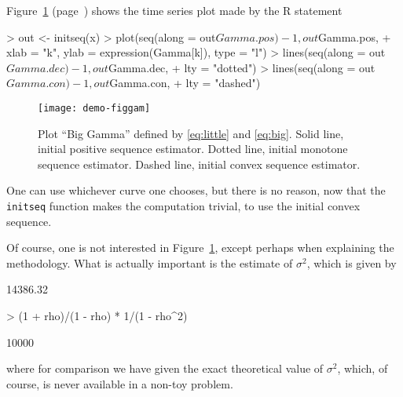 \documentclass{article}
\begin{document}
Figure~\ref{fig:gamma} (page~\pageref{fig:gamma})
shows the time series plot made by the R statement
\begin{Schunk}
\begin{Sinput}
> out <- initseq(x)
> plot(seq(along = out$Gamma.pos) - 1, out$Gamma.pos, 
+     xlab = "k", ylab = expression(Gamma[k]), type = "l")
> lines(seq(along = out$Gamma.dec) - 1, out$Gamma.dec, 
+     lty = "dotted")
> lines(seq(along = out$Gamma.con) - 1, out$Gamma.con, 
+     lty = "dashed")
\end{Sinput}
\end{Schunk}
\begin{figure}
\begin{center}
\texttt{[image: demo-figgam]}
\end{center}
\caption{Plot ``Big Gamma'' defined by \eqref{eq:little} and \eqref{eq:big}.
Solid line, initial positive sequence estimator.
Dotted line, initial monotone sequence estimator.
Dashed line, initial convex sequence estimator.}
\label{fig:gamma}
\end{figure}
One can use whichever curve one chooses, but there is no reason, now that
the \texttt{initseq} function makes the computation trivial, to use the
initial convex sequence.

Of course, one is not interested in Figure~\ref{fig:gamma}, except
perhaps when explaining the methodology.  What is actually important
is the estimate of $\sigma^2$, which is given by
\begin{Schunk}
\begin{Soutput}
[1] 14386.32
\end{Soutput}
\begin{Sinput}
> (1 + rho)/(1 - rho) * 1/(1 - rho^2)
\end{Sinput}
\begin{Soutput}
[1] 10000
\end{Soutput}
\end{Schunk}
where for comparison we have given the exact theoretical value of $\sigma^2$,
which, of course, is never available in a non-toy problem.
\end{document}
